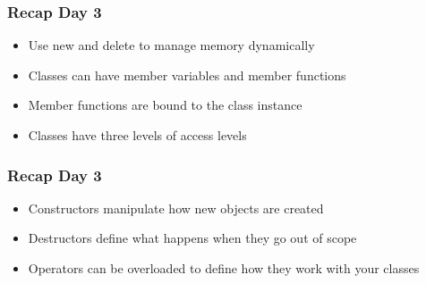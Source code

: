 \documentclass[14pt,a4paper,dvipsnames,usenames]{beamer}
\begin{document}
\begin{frame}
  \frametitle{Recap Day 3}

  \begin{itemize}
    \setlength\itemsep{0.75em}
    \item Use {\color{FeebleWeek}new} and {\color{Marty}delete} to manage memory dynamically
    \item Classes can have member variables and member functions
    \item Member functions are bound to the class instance
    \item Classes have three levels of access levels
  \end{itemize}
  
\end{frame}

\begin{frame}
  \frametitle{Recap Day 3}

  \begin{itemize}
    \setlength\itemsep{0.75em}
    \item Constructors manipulate how new objects are created
    \item Destructors define what happens when they go out of scope
    \item Operators can be overloaded to define how they work with your classes
  \end{itemize}
  
\end{frame}
\end{document}
